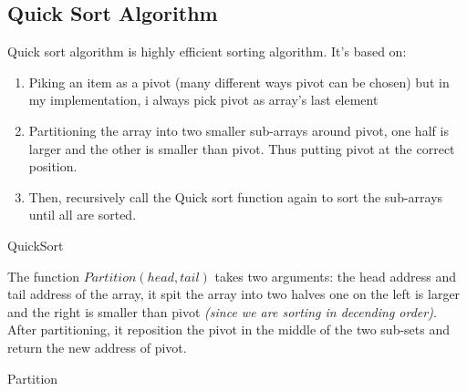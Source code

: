 \documentclass[a4paper]{article}
\begin{document}
\subsection{Quick Sort Algorithm}
Quick sort algorithm is highly efficient sorting algorithm. It's based on:
\begin{enumerate}
\item Piking an item as a pivot (many different ways pivot can be chosen) but in my implementation, i always pick pivot as array's last element
\item Partitioning the array into two smaller sub-arrays around pivot, one half is larger and the other is smaller than pivot. Thus putting pivot at the correct position.
\item Then, recursively call the Quick sort function again to sort the sub-arrays until all are sorted.
\end{enumerate}
\begin{algorithm}[H]
\DontPrintSemicolon
\SetAlgoLined
	\BlankLine  
  \caption{QuickSort}
\end{algorithm}
The function $Partition(head,tail)$ takes two arguments: the head address and tail address of the array, it spit the array into two halves one on the left is larger and the right is smaller than pivot \emph{(since we are sorting in decending order)}. After partitioning, it reposition the pivot in the middle of the two sub-sets and return the new address of pivot.\\
\begin{algorithm}[H]
\DontPrintSemicolon
\SetAlgoLined
	\BlankLine  
  \caption{Partition}
\end{algorithm}
\end{document}
